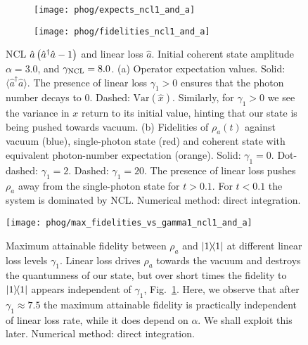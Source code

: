 \begin{figure}[htp]
\captionsetup{width=0.8\linewidth}
\centering
	\begin{subfigure}{0.7\linewidth}
	\centering
	\caption{}
	\texttt{[image: phog/expects\_ncl1\_and\_a]}
	\end{subfigure}
	\begin{subfigure}{0.7\linewidth}
	\centering
	\caption{}
	\texttt{[image: phog/fidelities\_ncl1\_and\_a]}
	\end{subfigure}
\caption{\label{fig:phog_A_ncl_loss} NCL $\hat{a}\left(\hat{a}^\dagger \hat{a} - 1\right)$ and linear loss $\hat{a}$. Initial coherent state amplitude $\alpha=3.0$, and $\gamma_{\text{NCL}}=8.0$. (a) Operator expectation values. Solid: $\langle \hat{a}^\dagger \hat{a}\rangle$. The presence of linear loss $\gamma_1 > 0$ ensures that the photon number decays to $0$. Dashed: $\text{Var}\left(\hat{x}\right)$. Similarly, for $\gamma_1 > 0$ we see the variance in $x$ return to its initial value, hinting that our state is being pushed towards vacuum. (b) Fidelities of $\rho_a\left(t\right)$ against vacuum (blue), single-photon state (red) and coherent state with equivalent photon-number expectation (orange). Solid: $\gamma_1 = 0$. Dot-dashed: $\gamma_1 = 2$. Dashed: $\gamma_1 = 20$. The presence of linear loss pushes $\rho_a$ away from the single-photon state for $t > 0.1$. For $t < 0.1$ the system is dominated by NCL. Numerical method: direct integration.}
\end{figure}


\begin{figure}[htp]
\captionsetup{width=0.8\linewidth}
\centering
\texttt{[image: phog/max\_fidelities\_vs\_gamma1\_ncl1\_and\_a]}
\caption{\label{fig:phog_max_fidelity} Maximum attainable fidelity between $\rho_a$ and $\dyad{1}$ at different linear loss levels $\gamma_1$. Linear loss drives $\rho_a$ towards the vacuum and destroys the quantumness of our state, but over short times the fidelity to $\dyad{1}$ appears independent of $\gamma_1$, Fig.~\ref{fig:phog_A_ncl_loss}. Here, we observe that after $\gamma_1 \approx 7.5$ the maximum attainable fidelity is practically independent of linear loss rate, while it does depend on $\alpha$. We shall exploit this later. Numerical method: direct integration.}
\end{figure}

